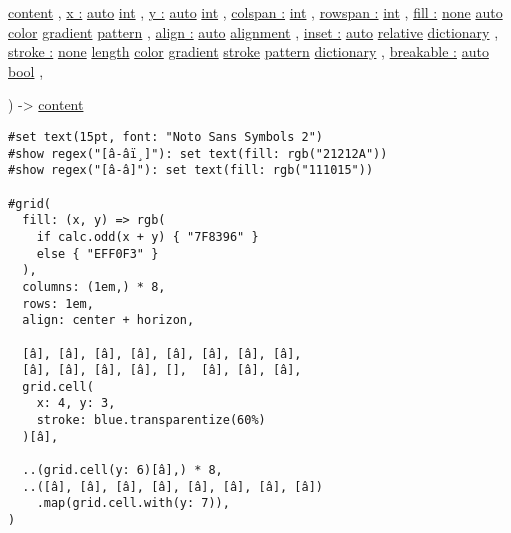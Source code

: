 { \href{/docs/reference/foundations/content/}{content} , } {
\hyperref[definitions-cell-parameters-x]{x :}
\href{/docs/reference/foundations/auto/}{auto}
\href{/docs/reference/foundations/int/}{int} , } {
\hyperref[definitions-cell-parameters-y]{y :}
\href{/docs/reference/foundations/auto/}{auto}
\href{/docs/reference/foundations/int/}{int} , } {
\hyperref[definitions-cell-parameters-colspan]{colspan :}
\href{/docs/reference/foundations/int/}{int} , } {
\hyperref[definitions-cell-parameters-rowspan]{rowspan :}
\href{/docs/reference/foundations/int/}{int} , } {
\hyperref[definitions-cell-parameters-fill]{fill :}
\href{/docs/reference/foundations/none/}{none}
\href{/docs/reference/foundations/auto/}{auto}
\href{/docs/reference/visualize/color/}{color}
\href{/docs/reference/visualize/gradient/}{gradient}
\href{/docs/reference/visualize/pattern/}{pattern} , } {
\hyperref[definitions-cell-parameters-align]{align :}
\href{/docs/reference/foundations/auto/}{auto}
\href{/docs/reference/layout/alignment/}{alignment} , } {
\hyperref[definitions-cell-parameters-inset]{inset :}
\href{/docs/reference/foundations/auto/}{auto}
\href{/docs/reference/layout/relative/}{relative}
\href{/docs/reference/foundations/dictionary/}{dictionary} , } {
\hyperref[definitions-cell-parameters-stroke]{stroke :}
\href{/docs/reference/foundations/none/}{none}
\href{/docs/reference/layout/length/}{length}
\href{/docs/reference/visualize/color/}{color}
\href{/docs/reference/visualize/gradient/}{gradient}
\href{/docs/reference/visualize/stroke/}{stroke}
\href{/docs/reference/visualize/pattern/}{pattern}
\href{/docs/reference/foundations/dictionary/}{dictionary} , } {
\hyperref[definitions-cell-parameters-breakable]{breakable :}
\href{/docs/reference/foundations/auto/}{auto}
\href{/docs/reference/foundations/bool/}{bool} , }

) -\textgreater{} \href{/docs/reference/foundations/content/}{content}

\begin{verbatim}
#set text(15pt, font: "Noto Sans Symbols 2")
#show regex("[â-âï¸]"): set text(fill: rgb("21212A"))
#show regex("[â-â]"): set text(fill: rgb("111015"))

#grid(
  fill: (x, y) => rgb(
    if calc.odd(x + y) { "7F8396" }
    else { "EFF0F3" }
  ),
  columns: (1em,) * 8,
  rows: 1em,
  align: center + horizon,

  [â], [â], [â], [â], [â], [â], [â], [â],
  [â], [â], [â], [â], [],  [â], [â], [â],
  grid.cell(
    x: 4, y: 3,
    stroke: blue.transparentize(60%)
  )[â],

  ..(grid.cell(y: 6)[â],) * 8,
  ..([â], [â], [â], [â], [â], [â], [â], [â])
    .map(grid.cell.with(y: 7)),
)
\end{verbatim}

